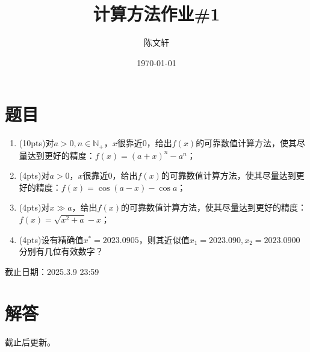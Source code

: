 \documentclass[cn,hazy,green,11pt,normal]{elegantnote}
\title{计算方法作业\#1}
\author{陈文轩}
\institute{KFRC}
\date{\today}
\begin{document}
\maketitle


\section{题目}

    \begin{enumerate}
        \item (10pts)对$a>0,n\in\mathbb{N_+}$，$x$很靠近$0$，给出$f(x)$的可靠数值计算方法，使其尽量达到更好的精度：$f(x)=(a+x)^n-a^n$；
        \item (4pts)对$a>0$，$x$很靠近$0$，给出$f(x)$的可靠数值计算方法，使其尽量达到更好的精度：$f(x)=\cos(a-x)-\cos a$；
        \item (4pts)对$x\gg a$，给出$f(x)$的可靠数值计算方法，使其尽量达到更好的精度：$f(x)=\sqrt{x^2+a}-x$；
        \item (4pts)设有精确值$x^{*}=2023.0905$，则其近似值$x_1=2023.090,x_2=2023.0900$分别有几位有效数字？
    \end{enumerate}

    截止日期：2025.3.9 23:59

\section{解答}
    截止后更新。
\end{document}
